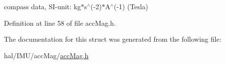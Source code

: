compass data, S\+I-\/unit\+: kg$\ast$s$^\wedge$(-\/2)$\ast$\+A$^\wedge$(-\/1) (Tesla) 



Definition at line 58 of file acc\+Mag.\+h.



The documentation for this struct was generated from the following file\+:\begin{DoxyCompactItemize}
\item 
hal/\+I\+M\+U/acc\+Mag/\hyperlink{accMag_8h}{acc\+Mag.\+h}\end{DoxyCompactItemize}
